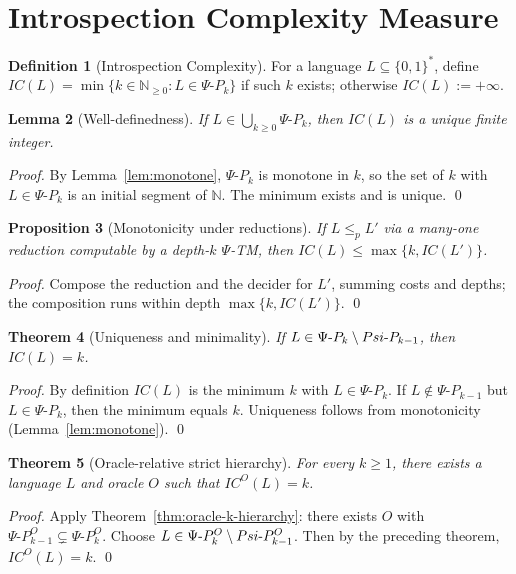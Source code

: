 \documentclass[11pt]{article}
\newtheorem{theorem}{Theorem}[section]
\newtheorem{lemma}[theorem]{Lemma}
\newtheorem{proposition}[theorem]{Proposition}
\theoremstyle{plain}
\theoremstyle{definition}
\newtheorem{definition}[theorem]{Definition}
\newcommand{\PSi}{\Psi}
\newcommand{\bits}{\{0,1\}}
\begin{document}
\section{Introspection Complexity Measure}

\begin{definition}[Introspection Complexity]
For a language $L\subseteq \bits^*$, define $IC(L)=\min\{k\in\mathbb{N}_{\ge0}: L\in \Psi\text{-}P_k\}$ if such $k$ exists; otherwise $IC(L):=+\infty$.
\end{definition}

\begin{lemma}[Well-definedness]
If $L\in\bigcup_{k\ge0} \Psi\text{-}P_k$, then $IC(L)$ is a unique finite integer.
\end{lemma}
\begin{proof}
By Lemma~\ref{lem:monotone}, $\Psi\text{-}P_k$ is monotone in $k$, so the set of $k$ with $L\in\Psi\text{-}P_k$ is an initial segment of $\mathbb{N}$. The minimum exists and is unique. \qed
\end{proof}

\begin{proposition}[Monotonicity under reductions]
If $L\le_p L'$ via a many-one reduction computable by a depth-$k$ $\PSi$-TM, then $IC(L)\le \max\{k, IC(L')\}$.
\end{proposition}
\begin{proof}
Compose the reduction and the decider for $L'$, summing costs and depths; the composition runs within depth $\max\{k,IC(L')\}$. \qed
\end{proof}

\begin{theorem}[Uniqueness and minimality]
If $L\in \Psi\text{-}P_k\\\setminus\\Psi\text{-}P_{k-1}$, then $IC(L)=k$.
\end{theorem}
\begin{proof}
By definition $IC(L)$ is the minimum $k$ with $L\in\Psi\text{-}P_k$. If $L\notin\Psi\text{-}P_{k-1}$ but $L\in\Psi\text{-}P_k$, then the minimum equals $k$. Uniqueness follows from monotonicity (Lemma~\ref{lem:monotone}). \qed
\end{proof}

\begin{theorem}[Oracle-relative strict hierarchy]
For every $k\ge1$, there exists a language $L$ and oracle $O$ such that $IC^{O}(L)=k$.
\end{theorem}
\begin{proof}
Apply Theorem~\ref{thm:oracle-k-hierarchy}: there exists $O$ with $\Psi\text{-}P_{k-1}^{O} \subsetneq \Psi\text{-}P_{k}^{O}$. Choose $L\in\Psi\text{-}P_k^{O}\\\setminus\\Psi\text{-}P_{k-1}^{O}$. Then by the preceding theorem, $IC^{O}(L)=k$. \qed
\end{proof}
\end{document}

